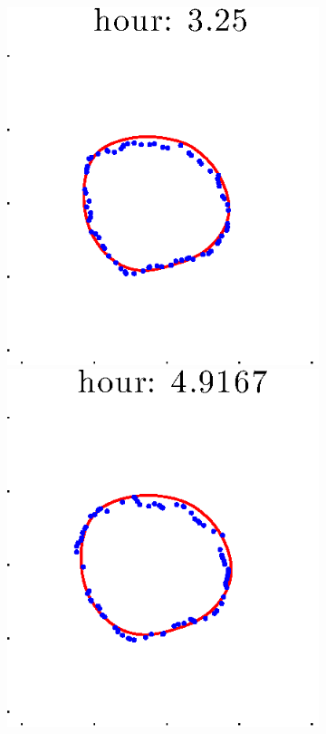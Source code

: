 \documentclass[12pt]{article}
\begin{document}
\begin{figure}[h!]
\begin{subfigure}[b]{.3\textwidth}
		\includegraphics[height=.15\textheight]{Pos5exp2/full/full3.eps}
		\includegraphics[height=.15\textheight]{Pos5exp2/full/full4.eps}

\end{subfigure}
\end{figure}
\end{document}
